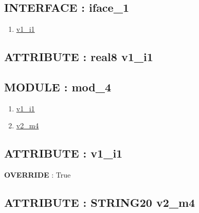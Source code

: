 \subsection*{INTERFACE : iface\_1}
\hypertarget{ecldoc:intest.in1intest.example_2_intest.in1intest.example_2.iface_1}{}
\begin{enumerate}
\item \hyperlink{ecldoc:intest.in1intest.example_2_intest.in1intest.example_2.iface_1.v1_i1}{v1\_i1}
\end{enumerate}
\subsection*{ATTRIBUTE : real8 v1\_i1}
\hypertarget{ecldoc:intest.in1intest.example_2_intest.in1intest.example_2.iface_1.v1_i1}{}

\subsection*{MODULE : mod\_4}
\hypertarget{ecldoc:intest.in1intest.example_2_intest.in1intest.example_2.mod_4}{}
\begin{enumerate}
\item \hyperlink{ecldoc:intest.in1intest.example_2_intest.in1intest.example_2.mod_4.v1_i1}{v1\_i1}
\item \hyperlink{ecldoc:intest.in1intest.example_2_intest.in1intest.example_2.mod_4.v2_m4}{v2\_m4}
\end{enumerate}
\subsection*{ATTRIBUTE : v1\_i1}
\hypertarget{ecldoc:intest.in1intest.example_2_intest.in1intest.example_2.mod_4.v1_i1}{}
\textbf{OVERRIDE} : True \\
\subsection*{ATTRIBUTE : STRING20 v2\_m4}
\hypertarget{ecldoc:intest.in1intest.example_2_intest.in1intest.example_2.mod_4.v2_m4}{}


